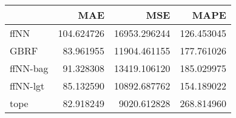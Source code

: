 \begin{tabular}{lrrr}
\toprule
{} &         MAE &           MSE &        MAPE \\
\midrule
ffNN     &  104.624726 &  16953.296244 &  126.453045 \\
GBRF     &   83.961955 &  11904.461155 &  177.761026 \\
ffNN-bag &   91.328308 &  13419.106120 &  185.029975 \\
ffNN-lgt &   85.132590 &  10892.687762 &  154.189022 \\
tope     &   82.918249 &   9020.612828 &  268.814960 \\
\bottomrule
\end{tabular}
